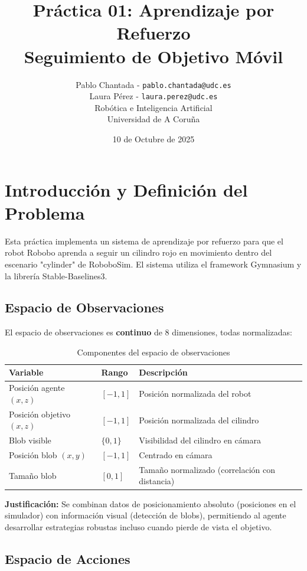 \documentclass[12pt,a4paper]{article}
\title{\textbf{Práctica 01: Aprendizaje por Refuerzo\\Seguimiento de Objetivo Móvil}}
\author{
    Pablo Chantada - \texttt{pablo.chantada@udc.es}\\
    Laura Pérez - \texttt{laura.perez@udc.es}\\
    Robótica e Inteligencia Artificial\\
    Universidad de A Coruña
}
\date{10 de Octubre de 2025}
\begin{document}
\maketitle

\section{Introducción y Definición del Problema}

Esta práctica implementa un sistema de aprendizaje por refuerzo para que el robot Robobo aprenda a seguir un cilindro rojo en movimiento dentro del escenario "cylinder" de RoboboSim. El sistema utiliza el framework Gymnasium y la librería Stable-Baselines3.

\subsection{Espacio de Observaciones}

El espacio de observaciones es \textbf{continuo} de 8 dimensiones, todas normalizadas:

\begin{table}[H]
\centering
\small
\begin{tabular}{@{}lll@{}}
\toprule
\textbf{Variable} & \textbf{Rango} & \textbf{Descripción} \\ \midrule
Posición agente $(x, z)$ & $[-1, 1]$ & Posición normalizada del robot \\
Posición objetivo $(x, z)$ & $[-1, 1]$ & Posición normalizada del cilindro \\
Blob visible & $\{0, 1\}$ & Visibilidad del cilindro en cámara \\
Posición blob $(x, y)$ & $[-1, 1]$ & Centrado en cámara \\
Tamaño blob & $[0, 1]$ & Tamaño normalizado (correlación con distancia) \\ \bottomrule
\end{tabular}
\caption{Componentes del espacio de observaciones}
\end{table}

\textbf{Justificación:} Se combinan datos de posicionamiento absoluto (posiciones en el simulador) con información visual (detección de blobs), permitiendo al agente desarrollar estrategias robustas incluso cuando pierde de vista el objetivo.

\subsection{Espacio de Acciones}
\end{document}
